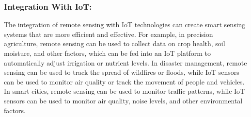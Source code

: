\subsubsection{Integration With IoT:}

The integration of remote sensing with IoT technologies can create smart sensing systems that are more efficient and effective. For example, in precision agriculture, remote sensing can be used to collect data on crop health, soil moisture, and other factors, which can be fed into an IoT platform to automatically adjust irrigation or nutrient levels. In disaster management, remote sensing can be used to track the spread of wildfires or floods, while IoT sensors can be used to monitor air quality or track the movement of people and vehicles. In smart cities, remote sensing can be used to monitor traffic patterns, while IoT sensors can be used to monitor air quality, noise levels, and other environmental factors.\cite{ullo2021advances}

